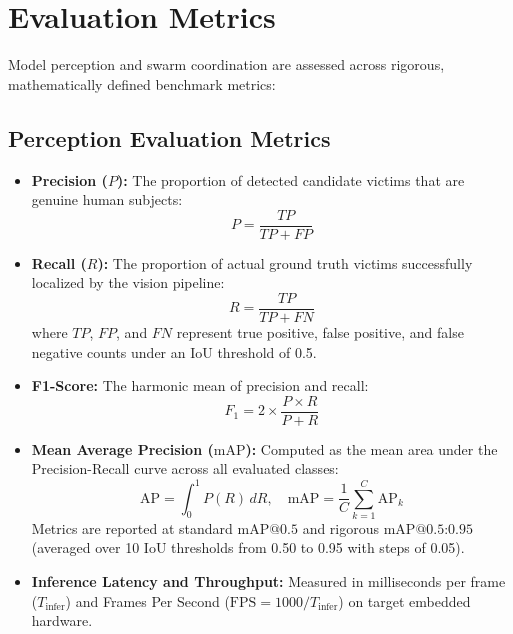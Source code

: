 \section{Evaluation Metrics}

Model perception and swarm coordination are assessed across rigorous, mathematically defined benchmark metrics:

\subsection{Perception Evaluation Metrics}
\begin{itemize}
    \item \textbf{Precision ($P$):} The proportion of detected candidate victims that are genuine human subjects:
    \begin{equation}
        P = \frac{TP}{TP + FP}
    \end{equation}
    \item \textbf{Recall ($R$):} The proportion of actual ground truth victims successfully localized by the vision pipeline:
    \begin{equation}
        R = \frac{TP}{TP + FN}
    \end{equation}
    where $TP$, $FP$, and $FN$ represent true positive, false positive, and false negative counts under an IoU threshold of 0.5.
    \item \textbf{F1-Score:} The harmonic mean of precision and recall:
    \begin{equation}
        F_1 = 2 \times \frac{P \times R}{P + R}
    \end{equation}
    \item \textbf{Mean Average Precision ($\text{mAP}$):} Computed as the mean area under the Precision-Recall curve across all evaluated classes:
    \begin{equation}
        \text{AP} = \int_{0}^{1} P(R) \, dR, \quad \text{mAP} = \frac{1}{C}\sum_{k=1}^C \text{AP}_k
    \end{equation}
    Metrics are reported at standard $\text{mAP@0.5}$ and rigorous $\text{mAP@0.5:0.95}$ (averaged over 10 IoU thresholds from 0.50 to 0.95 with steps of 0.05).
    \item \textbf{Inference Latency and Throughput:} Measured in milliseconds per frame ($T_{\text{infer}}$) and Frames Per Second ($\text{FPS} = 1000 / T_{\text{infer}}$) on target embedded hardware.
\end{itemize}

